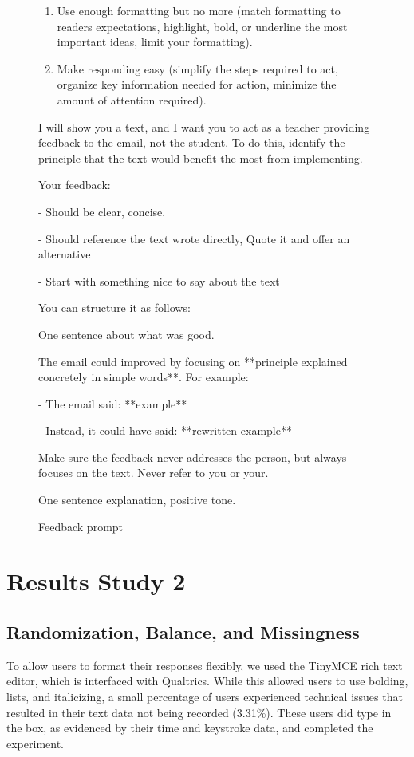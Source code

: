 \documentclass[11pt]{report}
\begin{document}
\begin{append}
\begin{figure}
\begin{tcolorbox}[colback=blue!5!white, colframe=blue!75!black, title=Feedback prompt]
\begin{enumerate}
\item Use enough formatting but no more (match formatting to readers expectations, highlight, bold, or underline the most important ideas, limit your formatting).

\item Make responding easy (simplify the steps required to act, organize key information needed for action, minimize the amount of attention required).
\end{enumerate}

I will show you a text, and I want you to act as a teacher providing feedback to the email, not the student. To do this, identify the principle that the text would benefit the most from implementing.

Your feedback:

- Should be clear, concise.

- Should reference the text wrote directly, Quote it and offer an alternative
    
- Start with something nice to say about the text
\vspace{1em}

You can structure it as follows:

One sentence about what was good.
	
The email could improved by focusing on **principle explained concretely in simple words**. For example:

- The email said: **example**

- Instead, it could have said: **rewritten example** 

Make sure the feedback never addresses the person, but always focuses on the text. Never refer to you or your.

One sentence explanation, positive tone.

\end{tcolorbox}
    \caption{Feedback prompt}
    \label{fig:feedback prompt}
\end{figure}



\FloatBarrier
\section{Results Study 2}

\subsection{Randomization, Balance, and Missingness}
To allow users to format their responses flexibly, we used the TinyMCE rich text editor, which is interfaced with Qualtrics. While this allowed users to use bolding, lists, and italicizing, a small percentage of users experienced technical issues that resulted in their text data not being recorded (3.31\%). These users did type in the box, as evidenced by their time and keystroke data, and completed the experiment. 


\end{append}
\end{document}
